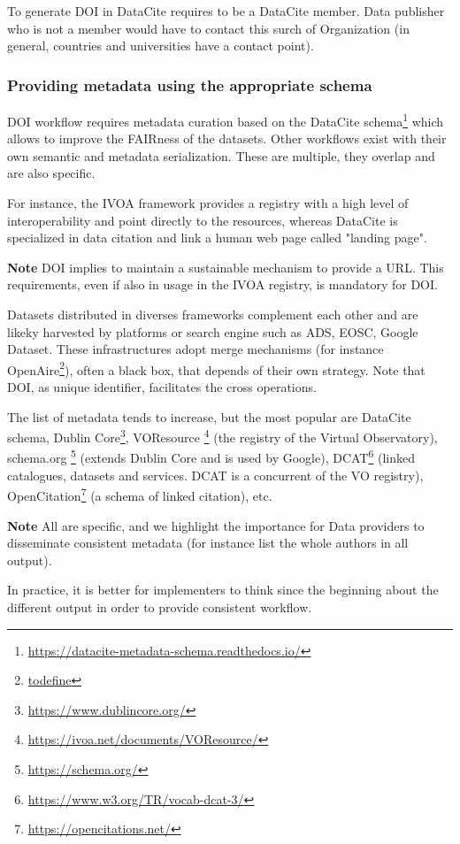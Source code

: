 \documentclass[11pt,a4paper]{ivoa}
\newcommand{\important}[1]{
	\begin{bigdescription}
		\item \color{ivoacolor}\textbf{Note} #1
	\end{bigdescription}
}
\begin{document}
To generate DOI in DataCite requires to be a DataCite member. Data publisher who is not a member would have to contact this surch of Organization (in general, countries and universities have a contact point).


\subsubsection{Providing metadata using the appropriate schema}
\label{sec:bestpractice:providing}
DOI workflow requires metadata curation based on the DataCite schema\footnote{\url{https://datacite-metadata-schema.readthedocs.io/}} which allows to improve the FAIRness of the datasets. Other workflows exist with their own semantic and metadata serialization. These are multiple, they overlap and are also specific.

For instance, the IVOA framework provides a registry with a high level  of interoperability and point directly to the resources, whereas DataCite is specialized in data citation and link a human web page called "landing page".

\important{
DOI implies to maintain a sustainable mechanism to provide a URL. 
This requirements, even if also in usage in the IVOA registry, is mandatory for DOI.
}

Datasets distributed in diverses frameworks complement each other and are likeky harvested by platforms or search engine such as ADS, EOSC, Google Dataset. These infrastructures adopt merge mechanisms (for instance OpenAire\footnote{\url{todefine}}), often a black box, that depends of their own strategy. Note that DOI, as unique identifier, facilitates the cross operations.

The list of metadata tends to increase, but the most popular are DataCite schema, Dublin Core\footnote{\url{https://www.dublincore.org/}}, VOResource \footnote{\url{https://ivoa.net/documents/VOResource/}} (the registry of the Virtual Observatory), schema.org \footnote{\url{https://schema.org/}} (extends Dublin Core and is used by Google), DCAT\footnote{\url{https://www.w3.org/TR/vocab-dcat-3/}} (linked catalogues, datasets and services. DCAT is a concurrent of the VO registry), OpenCitation\footnote{\url{https://opencitations.net/}} (a schema of linked citation),  etc.

\important{
All are specific, and we highlight the importance for Data providers to disseminate consistent metadata
(for instance list the whole authors in all output).
}

In practice, it is better for implementers to think since the beginning about the different output in order to provide consistent workflow.
\end{document}
